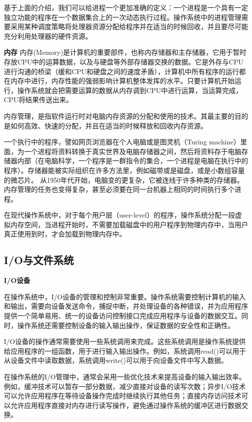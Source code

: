 基于上面的介绍，我们可以给进程一个更加准确的定义：一个进程是一个具有一定独立功能的程序在一个数据集合上的一次动态执行过程。操作系统中的进程管理需要采用某种调度策略将处理器资源分配给程序并在适当的时候回收，并且要尽可能充分利用处理器的硬件资源。

\textbf{内存}
内存(Memory)是计算机的重要部件，也称内存储器和主存储器，它用于暂时存放CPU中的运算数据，以及与硬盘等外部存储器交换的数据。它是外存与CPU进行沟通的桥梁（缓和CPU和硬盘之间的速度矛盾），计算机中所有程序的运行都在内存中进行，内存性能的强弱影响计算机整体发挥的水平。只要计算机开始运行，操作系统就会把需要运算的数据从内存调到CPU中进行运算，当运算完成，CPU将结果传送出来。

内存管理，是指软件运行时对电脑内存资源的分配和使用的技术。其最主要的目的是如何高效、快速的分配，并且在适当的时候释放和回收内存资源。

一个执行中的程序，譬如网页浏览器在个人电脑或是图灵机（Turing machine）里面，为一个进程将资料转换于真实世界及电脑存储器之间，然后将资料存于电脑存储器内部（在电脑科学，一个程序是一群指令的集合，一个进程是电脑在执行中的程序）。存储器能被实际组织在许多方法里，例如磁带或是磁盘，或是小数组容量的微芯片。 从1950年代开始，电脑变的更复杂，它被连线于许多种类的存储器。内存管理的任务也变得复杂，甚至必须要在同一台机器上相同的时间执行多个进程。

在现代操作系统中，对于每个用户层（user-level）的程序，操作系统分配一段虚拟内存空间，当进程开始时，不需要加载磁盘中的用户程序到物理内存中，当用户真正使用到时，才会加载到物理内存中。

\subsection{I/O与文件系统}
\textbf{I/O设备}

在操作系统中，I/O设备的管理和控制非常重要。操作系统需要控制计算机的输入和输出，需要向设备发送命令，捕捉中断，并处理设备的各种错误，并为应用程序提供一个简单易用、统一的设备访问控制接口完成应用程序与设备的数据交互。同时，操作系统还需要控制设备的输入输出操作，保证数据的安全性和正确性。

I/O设备的操作通常需要使用一些系统调用来完成。这些系统调用是操作系统提供给应用程序的一组函数，用于进行输入输出操作。例如，系统调用read()可以用于从设备文件中读取数据，系统调用write()可以用于向设备文件中写入数据。

在操作系统的I/O管理中，通常会采用一些优化技术来提高设备的输入输出效率。例如，缓冲技术可以暂存一部分数据，减少直接对设备的读写次数；异步I/O技术可以允许应用程序在等待设备操作完成时继续执行其他任务；直接内存访问技术可以允许应用程序直接对内存进行读写操作，避免通过操作系统的缓冲区进行数据交换。

